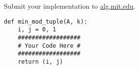 \documentclass[12pt,twoside]{article}
\begin{document}

\begin{problems}

\problem  %

\begin{problemparts}
\problempart %
\problempart %
\problempart %
\end{problemparts}

\problem  %

\begin{problemparts}
\problempart %
\problempart %
\problempart %
\end{problemparts}

\problem  %

\begin{problemparts}
\problempart %
\problempart %
\problempart %
\end{problemparts}

\problem  %

\newpage
\problem  %

\vfill
\problem  %
Submit your implementation to {\small\url{alg.mit.edu}}.

\begin{lstlisting}
def min_mod_tuple(A, k):
    i, j = 0, 1
    ##################
    # Your Code Here #
    ##################
    return (i, j)
\end{lstlisting}

\end{problems}
\end{document}
